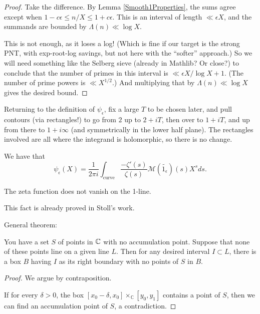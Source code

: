 \begin{proof}
Take the difference. By Lemma \ref{Smooth1Properties}, the sums agree except when $1-c \epsilon \leq n/X \leq 1+c \epsilon$. This is an interval of length $\ll \epsilon X$, and the summands are bounded by $\Lambda(n) \ll \log X$.

This is not enough, as it loses a log! (Which is fine if our target is the strong PNT, with exp-root-log savings, but not here with the ``softer'' approach.) So we will need something like the Selberg sieve (already in Mathlib? Or close?) to conclude that the number of primes in this interval is $\ll \epsilon X / \log X + 1$.
(The number of prime powers is $\ll X^{1/2}$.)
And multiplying that by $\Lambda (n) \ll \log X$ gives the desired bound.
\end{proof}



Returning to the definition of $\psi_{\epsilon}$, fix a large $T$ to be chosen later, and pull contours (via rectangles!) to go
from $2$ up to $2+iT$, then over to $1+iT$, and up from there to $1+i\infty$ (and symmetrically in the lower half plane).  The
rectangles involved are all where the integrand is holomorphic, so there is no change.
\begin{theorem}\label{SmoothedChebyshevPull1}
We have that
$$\psi_{\epsilon}(X) = \frac{1}{2\pi i}\int_{\text{curve}}\frac{-\zeta'(s)}{\zeta(s)}
\mathcal{M}(\widetilde{1_{\epsilon}})(s)
X^{s}ds.$$
\end{theorem}



\begin{theorem}\label{ZetaNoZerosOn1Line}
The zeta function does not vanish on the 1-line.
\end{theorem}
This fact is already proved in Stoll's work.



General theorem:
\begin{theorem}\label{NoZerosInBoxOfNoneOnBoundary}
You have a set $S$ of points in $\C$ with no accumulation point.
Suppose that none of these points line on a given line $L$.
Then for any desired interval $I \subset L $, there is a box $B$ having $I$ as its right boundary with no points of $S$ in $B$.
\end{theorem}



\begin{proof}
We argue by contraposition.



If for every $\delta>0$, the box $[x_0-\delta,x_0] \times_{ℂ} [y_0,y_1]$ contains a point of $S$, then we can find an
accumulation point
 of $S$, a contradiction.
\end{proof}



